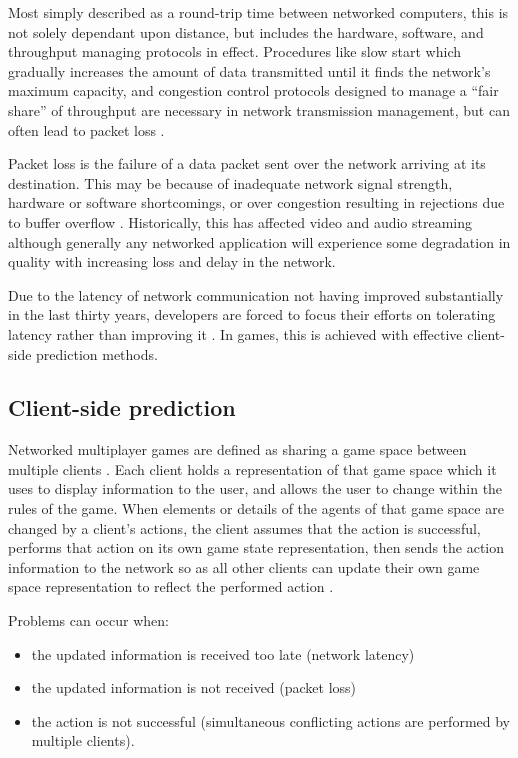 \documentclass[journal]{IEEEtran}
\begin{document}
Most simply described as a round-trip time between networked computers, this is not solely dependant upon distance, but includes the hardware, software, and throughput managing protocols in effect. Procedures like slow start \cite{stevens1997tcp} which gradually increases the amount of data transmitted until it finds the network's maximum capacity, and congestion control protocols designed to manage a ``fair share'' of throughput \cite{vicisano1998tcp} \cite{padhye1998modeling} are necessary in network transmission management, but can often lead to packet loss \cite{cardwell2000modeling}.

Packet loss is the failure of a data packet sent over the network arriving at its destination. This may be because of inadequate network signal strength, hardware or software shortcomings, or over congestion resulting in rejections due to buffer overflow \cite{bolot1993end}. Historically, this has affected video and audio streaming \cite{perkins1998survey} \cite{kanumuri2006modeling} \cite{zhang2000video} although generally any networked application will experience some degradation in quality with increasing loss and delay in the network.

Due to the latency of network communication not having improved substantially in the last thirty years, developers are forced to focus their efforts on tolerating latency rather than improving it \cite{rumble2011s}. In games, this is achieved with effective client-side prediction methods.

\subsection{Client-side prediction} \label{clientSidePrediction}

Networked multiplayer games are defined as sharing a game space between multiple clients \cite{diot1999distributed}. Each client holds a representation of that game space which it uses to display information to the user, and allows the user to change within the rules of the game. When elements or details of the agents of that game space are changed by a client's actions, the client assumes that the action is successful, performs that action on its own game state representation, then sends the action information to the network so as all other clients can update their own game space representation to reflect the performed action \cite{bernier2001latency}.

Problems can occur when:
\begin{itemize}
    \item the updated information is received too late (network latency)
    \item the updated information is not received (packet loss)
    \item the action is not successful (simultaneous conflicting actions are performed by multiple clients).
\end{itemize}
\end{document}
